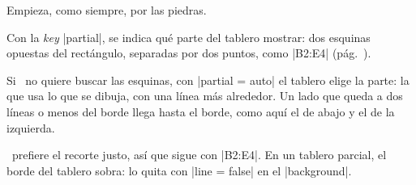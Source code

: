 \begin{goban}
\begin{figure}[H]
	\centering
	\begin{goban}[partial = B2:E4, background = {line = false}]
	\end{goban}
\end{figure}

Empieza, como siempre, por las piedras.

\begin{codeexample}[width=5cm]
	\begin{goban}
	\end{goban}
\end{codeexample}

Con la \emph{key} |partial|, se indica qué parte del tablero mostrar: dos esquinas opuestas del rectángulo, separadas por dos puntos, como |B2:E4| (pág.~\pageref{subsec:parcial}).

\begin{codeexample}[]
	\begin{goban}[partial = B2:E4]
		\stones[b]{C2,B3,C4}
		\stones[w]{D4,E3,D2,C3}
	\end{goban}
\end{codeexample}

Si \karu\ no quiere buscar las esquinas, con |partial = auto| el tablero elige la parte: la que usa lo que se dibuja, con una línea más alrededor. Un lado que queda a dos líneas o menos del borde llega hasta el borde, como aquí el de abajo y el de la izquierda.

\begin{codeexample}[]
	\begin{goban}[partial = auto]
	\end{goban}
\end{codeexample}

\karu\ prefiere el recorte justo, así que sigue con |B2:E4|. En un tablero parcial, el borde del tablero sobra: lo quita con |line = false| en el |background|.

\begin{codeexample}[]
	\begin{goban}[partial = B2:E4, background = {line = false}]
	\end{goban}
\end{codeexample}


\end{goban}
